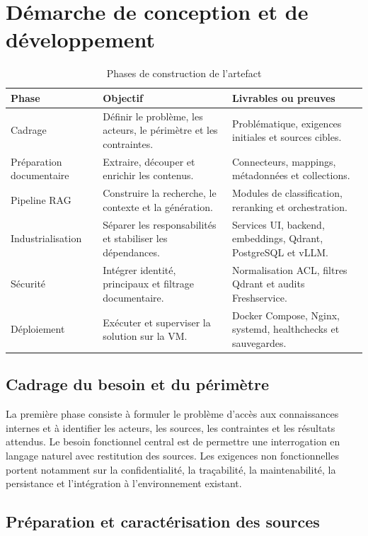\section{Démarche de conception et de développement}

\begin{table}[H]
\centering
\caption{Phases de construction de l'artefact}
\label{tab:phases_construction}
\begin{tabular}{p{2.8cm}p{5.2cm}p{5.1cm}}
\toprule
\textbf{Phase} & \textbf{Objectif} & \textbf{Livrables ou preuves} \\
\midrule
Cadrage & Définir le problème, les acteurs, le périmètre et les contraintes. & Problématique, exigences initiales et sources cibles. \\
Préparation documentaire & Extraire, découper et enrichir les contenus. & Connecteurs, mappings, métadonnées et collections. \\
Pipeline RAG & Construire la recherche, le contexte et la génération. & Modules de classification, reranking et orchestration. \\
Industrialisation & Séparer les responsabilités et stabiliser les dépendances. & Services UI, backend, embeddings, Qdrant, PostgreSQL et vLLM. \\
Sécurité & Intégrer identité, principaux et filtrage documentaire. & Normalisation ACL, filtres Qdrant et audits Freshservice. \\
Déploiement & Exécuter et superviser la solution sur la VM. & Docker Compose, Nginx, systemd, healthchecks et sauvegardes. \\
\bottomrule
\end{tabular}
\end{table}

\subsection{Cadrage du besoin et du périmètre}

La première phase consiste à formuler le problème d'accès aux connaissances internes et à identifier les acteurs, les sources, les contraintes et les résultats attendus. Le besoin fonctionnel central est de permettre une interrogation en langage naturel avec restitution des sources. Les exigences non fonctionnelles portent notamment sur la confidentialité, la traçabilité, la maintenabilité, la persistance et l'intégration à l'environnement existant.

\subsection{Préparation et caractérisation des sources}

